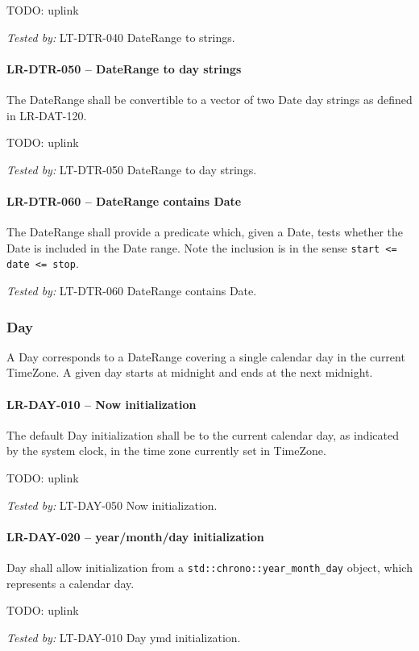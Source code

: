 TODO: uplink

\textit{Tested by: } LT-DTR-040 DateRange to strings.

\paragraph{LR-DTR-050 -- DateRange to day strings}
The DateRange shall be convertible to a vector of two Date day strings
as defined in LR-DAT-120.

TODO: uplink

\textit{Tested by: } LT-DTR-050 DateRange to day strings.

\paragraph{LR-DTR-060 -- DateRange contains Date}
The DateRange shall provide a predicate which, given a Date,
tests whether the Date is included in the Date range.
Note the inclusion is in the sense \lstinline{start <= date <= stop}.

\textit{Tested by: } LT-DTR-060 DateRange contains Date.

\subsubsection{Day}
A Day corresponds to a DateRange covering a single calendar day in
the current TimeZone. A given day starts at midnight and ends at the next
midnight.

\paragraph{LR-DAY-010 -- Now initialization}
The default Day initialization shall be to the current calendar day,
as indicated by the system clock, in the time zone currently set
in TimeZone.

TODO: uplink

\textit{Tested by: } LT-DAY-050 Now initialization.

\paragraph{LR-DAY-020 -- year/month/day initialization}
Day shall allow initialization from a \lstinline{std::chrono::year_month_day}
object, which represents a calendar day.

TODO: uplink

\textit{Tested by: } LT-DAY-010 Day ymd initialization.

